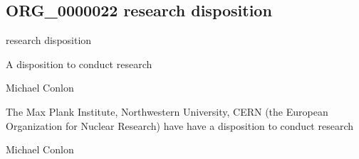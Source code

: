 \documentclass[letterpaper,10pt,english]{sphinxmanual}
\begin{document}
\subsection{ORG\_0000022 \sphinxhyphen{} research disposition}
\label{\detokenize{doc-ORG_0000022:org-0000022-research-disposition}}\label{\detokenize{doc-ORG_0000022:index-0}}\label{\detokenize{doc-ORG_0000022::doc}}
\begin{sphinxShadowBox}

\sphinxAtStartPar
research disposition
\end{sphinxShadowBox}

\begin{sphinxShadowBox}

\sphinxAtStartPar
{\hyperref[\detokenize{doc-BFO_0000016::doc}]{}}
\end{sphinxShadowBox}

\begin{sphinxShadowBox}

\sphinxAtStartPar
A disposition to conduct research
\end{sphinxShadowBox}

\begin{sphinxShadowBox}

\sphinxAtStartPar
Michael Conlon 
\end{sphinxShadowBox}

\begin{sphinxShadowBox}

\sphinxAtStartPar
The Max Plank Institute, Northwestern University, CERN (the European Organization for Nuclear Research) have have a disposition to conduct research
\end{sphinxShadowBox}

\begin{sphinxShadowBox}

\sphinxAtStartPar
Michael Conlon 
\end{sphinxShadowBox}
\begin{quote}

\ignorespaces \end{quote}
\end{document}

